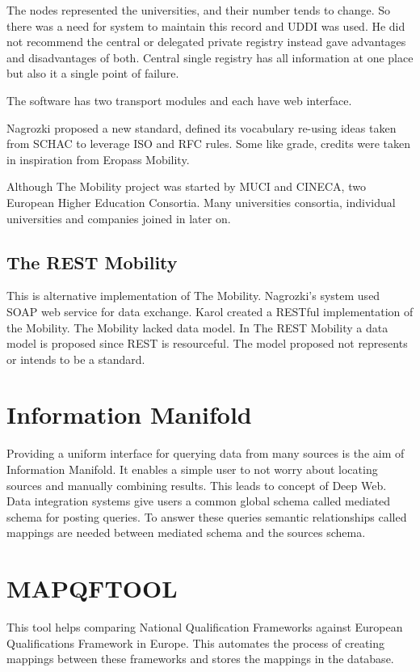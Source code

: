 \documentclass[12pt,a4paper,oneside]{book} %
\begin{document}
    The nodes represented the universities, and their number tends to change. So there was a need for system to maintain this record and UDDI was used. He did not recommend the central or delegated private registry instead gave advantages and disadvantages of both. Central single registry has all information at one place but also it a single point of failure.

    The software has two transport modules and each have web interface.

    Nagrozki proposed a new standard, defined its vocabulary re-using ideas taken from SCHAC to leverage ISO and RFC rules. Some like grade, credits were taken in inspiration from Eropass Mobility.

    Although The Mobility project was started by MUCI and CINECA, two European Higher Education Consortia. Many universities consortia, individual universities and companies joined in later on.

    \subsection{The REST Mobility}
    This is alternative implementation of The Mobility. Nagrozki's system used SOAP web service for data exchange. Karol created a RESTful implementation of the Mobility. The Mobility lacked data model. In The REST Mobility a data model is proposed since REST is resourceful. The model proposed not represents or intends to be a standard.

\section{Information Manifold}
Providing a uniform interface for querying data from many sources is the aim of Information Manifold. It enables a simple user to not worry about locating sources and manually combining results. This leads to concept of Deep Web. Data integration systems give users a common global schema called mediated schema for posting queries. To answer these queries semantic relationships called mappings are needed between mediated schema and the sources schema.

\section{MAPQFTOOL}
This tool helps comparing National Qualification Frameworks against European Qualifications Framework in Europe. This automates the process of creating mappings between these frameworks and stores the mappings in the database.
\end{document}
